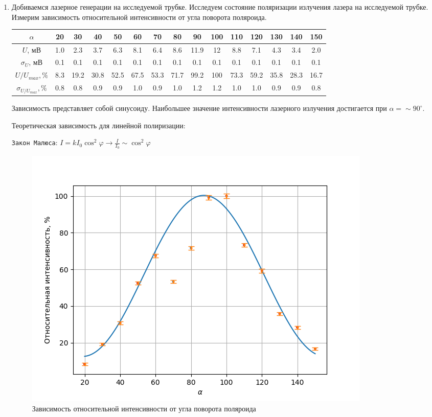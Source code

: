 \documentclass[a4paper,12pt]{article}
\begin{document}
\begin{enumerate}
    \item Добиваемся лазерное генерации на исследуемой трубке. Исследуем состояние поляризации излучения лазера на исследуемой трубке. Измерим зависимость относительной интенсивности от угла поворота поляроида.
    \begin{table}[h!]
    \centering
    \begin{tabular}{||c||c|c|c|c|c|c|c|c|c|c|c|c|c|c||}
    \hline
        $\alpha$ & 20 & 30 & 40 & 50 & 60 & 70 & 80 & 90 & 100 & 110 & 120 & 130 & 140 & 150  \\
        \hline
        $U$, мВ & 1.0 & 2.3 & 3.7 & 6.3 & 8.1 & 6.4 & 8.6 & 11.9 & 12 & 8.8 & 7.1 & 4.3 & 3.4 & 2.0 \\
        \hline
        $\sigma_U$, мВ & 0.1 & 0.1 & 0.1 & 0.1 & 0.1 & 0.1 & 0.1 & 0.1 & 0.1 & 0.1 & 0.1 & 0.1 & 0.1 & 0.1 \\
        \hline
        $U/U_{max},\%$ & 8.3 & 19.2 & 30.8 & 52.5 & 67.5 & 53.3 & 71.7 & 99.2 & 100 & 73.3 & 59.2 & 35.8 & 28.3 & 16.7 \\
        \hline
        $\sigma_{U/U_{max}}, \%$ & 0.8 & 0.8 & 0.9 & 0.9 & 1.0 & 0.9 & 1.0 & 1.2 & 1.2 & 1.0 & 1.0 & 0.9 & 0.9 & 0.8 \\
        \hline
    \end{tabular}
    \end{table}

    Зависимость представляет собой синусоиду. Наибольшее значение интенсивности лазерного излучения достигается при $\alpha = \sim90^\circ$.

    Теоретическая зависимость для линейной полиризации:
    
    \texttt{Закон Малюса}:     
    $I = kI_0 \cos^2{\varphi} \rightarrow \frac{I}{I_0} \sim \cos^2{\varphi}$
    
    \begin{figure}[h]
    \centering
    \includegraphics[width=0.9\linewidth]{graph1.png}
    \caption{Зависимость относительной интенсивности от угла поворота поляроида}
    \label{graph1}
    \end{figure}


\end{enumerate}
\end{document}
